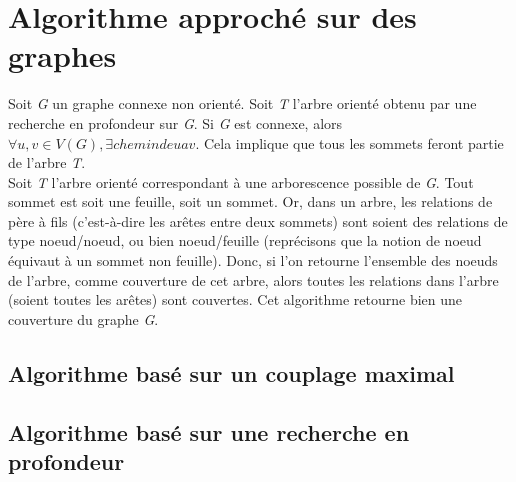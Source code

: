 
\section{Algorithme approch\'e sur des graphes}

Soit \textit{G} un graphe connexe non orient\'e. Soit \textit{T} l'arbre orient\'e obtenu par une recherche en profondeur sur \textit{G}.
Si \textit{G} est connexe, alors \textit{$\forall u,v \in V(G), \exists chemin de u a v$}. Cela implique que tous les sommets
feront partie de l'arbre \textit{T}.\\

Soit \textit{T} l'arbre orient\'e correspondant \`a une arborescence possible de \textit{G}. Tout sommet est soit une feuille,
soit un sommet. Or, dans un arbre, les relations de p\`ere \`a fils (c'est-\`a-dire les ar\^etes entre deux sommets) sont soient
des relations de type noeud/noeud, ou bien noeud/feuille (repr\'ecisons que la notion de noeud \'equivaut \`a un sommet non feuille).
Donc, si l'on retourne l'ensemble des noeuds de l'arbre, comme couverture de cet arbre, alors toutes les relations dans l'arbre (soient
toutes les ar\^etes) sont couvertes. Cet algorithme retourne bien une couverture du graphe \textit{G}.

\subsection{Algorithme bas\'e sur un couplage maximal}



\subsection{Algorithme bas\'e sur une recherche en profondeur}

